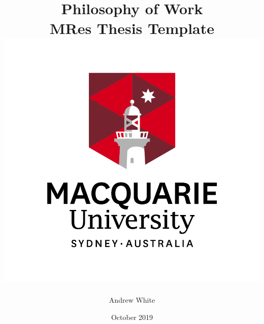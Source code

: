 






\title{{Philosophy of Work}\\ 
{\large MRes Thesis Template}\\
{\includegraphics{MQ_INT_VER_RGB_POS.PNG}}
}
\author{Andrew White} %
\date{October 2019} %

